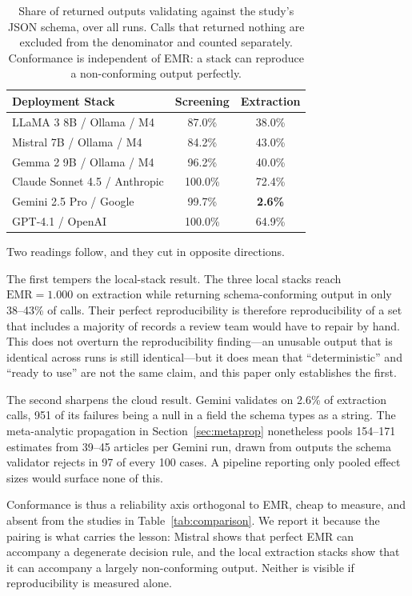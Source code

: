 \documentclass[preprint,review,12pt,authoryear]{elsarticle}
\newcommand{\emr}{\textrm{EMR}}
\begin{document}
\begin{table}[htbp]
\centering
\caption{Share of returned outputs validating against the study's JSON schema, over all runs. Calls that returned nothing are excluded from the denominator and counted separately. Conformance is independent of EMR: a stack can reproduce a non-conforming output perfectly.}
\label{tab:conformance}
\begin{tabular}{lcc}
\toprule
\textbf{Deployment Stack} & \textbf{Screening} & \textbf{Extraction} \\
\midrule
LLaMA 3 8B / Ollama / M4       & 87.0\% & 38.0\% \\
Mistral 7B / Ollama / M4       & 84.2\% & 43.0\% \\
Gemma 2 9B / Ollama / M4       & 96.2\% & 40.0\% \\
\midrule
Claude Sonnet 4.5 / Anthropic  & 100.0\% & 72.4\% \\
Gemini 2.5 Pro / Google        & 99.7\% & \textbf{2.6\%} \\
GPT-4.1 / OpenAI               & 100.0\% & 64.9\% \\
\bottomrule
\end{tabular}
\end{table}

\noindent Two readings follow, and they cut in opposite directions.

The first tempers the local-stack result. The three local stacks reach $\emr{=}1.000$ on extraction while returning schema-conforming output in only 38--43\% of calls. Their perfect reproducibility is therefore reproducibility of a set that includes a majority of records a review team would have to repair by hand. This does not overturn the reproducibility finding---an unusable output that is identical across runs is still identical---but it does mean that ``deterministic'' and ``ready to use'' are not the same claim, and this paper only establishes the first.

The second sharpens the cloud result. Gemini validates on 2.6\% of extraction calls, 951 of its failures being a null in a field the schema types as a string. The meta-analytic propagation in Section~\ref{sec:metaprop} nonetheless pools 154--171 estimates from 39--45 articles per Gemini run, drawn from outputs the schema validator rejects in 97 of every 100 cases. A pipeline reporting only pooled effect sizes would surface none of this.

Conformance is thus a reliability axis orthogonal to EMR, cheap to measure, and absent from the studies in Table~\ref{tab:comparison}. We report it because the pairing is what carries the lesson: Mistral shows that perfect EMR can accompany a degenerate decision rule, and the local extraction stacks show that it can accompany a largely non-conforming output. Neither is visible if reproducibility is measured alone.
\end{document}
